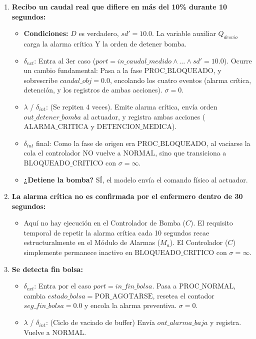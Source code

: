 \begin{itemize}
\begin{enumerate}
        \item \textbf{Recibo un caudal real que difiere en más del 10\% durante 10 segundos:}
        \begin{itemize}
            \item \textbf{Condiciones:} $D$ es verdadero, $sd' = 10.0$. La variable auxiliar $Q_{desvio}$ carga la alarma crítica Y la orden de detener bomba.
            \item $\delta_{ext}$: Entra al 3er caso ($port = in\_caudal\_medido \land \dots \land sd' = 10.0$). Ocurre un cambio fundamental: Pasa a la fase $\text{PROC\_BLOQUEADO}$, y sobrescribe $caudal\_obj = 0.0$, encolando los cuatro eventos (alarma crítica, detención, y los registros de ambas acciones). $\sigma = 0$.
            \item $\lambda$ / $\delta_{int}$: (Se repiten 4 veces). Emite alarma crítica, envía orden $out\_detener\_bomba$ al actuador, y registra ambas acciones ($\text{ALARMA\_CRITICA}$ y $\text{DETENCION\_MEDICA}$).
            \item $\delta_{int}$ final: Como la fase de origen era $\text{PROC\_BLOQUEADO}$, al vaciarse la cola el controlador NO vuelve a $\text{NORMAL}$, sino que transiciona a $\text{BLOQUEADO\_CRITICO}$ con $\sigma = \infty$.
            \item \textbf{¿Detiene la bomba?} SÍ, el modelo envía el comando físico al actuador.
        \end{itemize}

        \item \textbf{La alarma crítica no es confirmada por el enfermero dentro de 30 segundos:}
        \begin{itemize}
            \item Aquí no hay ejecución en el Controlador de Bomba ($C$). El requisito temporal de repetir la alarma crítica cada 10 segundos recae estructuralmente en el Módulo de Alarmas ($M_a$). El Controlador ($C$) simplemente permanece inactivo en $\text{BLOQUEADO\_CRITICO}$ con $\sigma = \infty$.
        \end{itemize}

        \item \textbf{Se detecta fin bolsa:}
        \begin{itemize}
            \item $\delta_{ext}$: Entra por el caso $port = in\_fin\_bolsa$. Pasa a $\text{PROC\_NORMAL}$, cambia $estado\_bolsa = \text{POR\_AGOTARSE}$, resetea el contador $seg\_fin\_bolsa = 0.0$ y encola la alarma preventiva. $\sigma = 0$.
            \item $\lambda$ / $\delta_{int}$: (Ciclo de vaciado de buffer) Envía $out\_alarma\_baja$ y registra. Vuelve a $\text{NORMAL}$.
        \end{itemize}


\end{enumerate}
\end{itemize}
